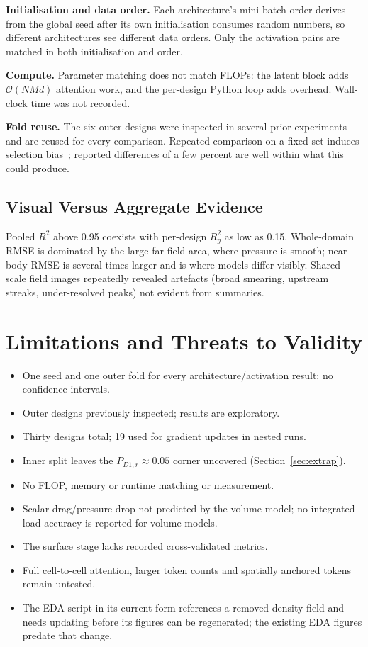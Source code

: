 \documentclass[journal]{IEEEtran}
\newcommand{\pdone}{P_{D1,r}}
\begin{document}
\textbf{Initialisation and data order.} Each architecture's mini-batch order
derives from the global seed after its own initialisation consumes random
numbers, so different architectures see different data orders. Only the
activation pairs are matched in both initialisation and order.

\textbf{Compute.} Parameter matching does not match FLOPs: the latent block
adds $\mathcal{O}(NMd)$ attention work, and the per-design Python loop adds
overhead. Wall-clock time was not recorded.

\textbf{Fold reuse.} The six outer designs were inspected in several prior
experiments and are reused for every comparison. Repeated comparison on a fixed
set induces selection bias~\cite{cawley2010}; reported differences of a few
percent are well within what this could produce.

\subsection{Visual Versus Aggregate Evidence}
Pooled $R^2$ above 0.95 coexists with per-design $R^2_g$ as low as 0.15.
Whole-domain RMSE is dominated by the large far-field area, where pressure is
smooth; near-body RMSE is several times larger and is where models differ
visibly. Shared-scale field images repeatedly revealed artefacts (broad
smearing, upstream streaks, under-resolved peaks) not evident from summaries.

\section{Limitations and Threats to Validity}
\label{sec:limits}
\begin{itemize}
\item One seed and one outer fold for every architecture/activation result;
no confidence intervals.
\item Outer designs previously inspected; results are exploratory.
\item Thirty designs total; 19 used for gradient updates in nested runs.
\item Inner split leaves the $\pdone\approx0.05$ corner uncovered
(Section~\ref{sec:extrap}).
\item No FLOP, memory or runtime matching or measurement.
\item Scalar drag/pressure drop not predicted by the volume model; no
integrated-load accuracy is reported for volume models.
\item The surface stage lacks recorded cross-validated metrics.
\item Full cell-to-cell attention, larger token counts and spatially anchored
tokens remain untested.
\item The EDA script in its current form references a removed density field
and needs updating before its figures can be regenerated; the existing EDA
figures predate that change.
\end{itemize}
\end{document}
